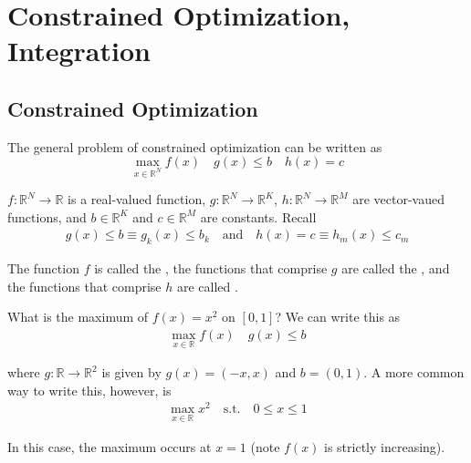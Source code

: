 \documentclass{article}
\begin{document}
\displayoptions

\section{Constrained Optimization, Integration}
\label{sec:constrained_optimization_integration}

\localtableofcontents

\subsection{Constrained Optimization}
\label{sub:constrained_optimization}

The general problem of constrained optimization can be written as
\begin{equation}\label{eq:lecture5_main_problem}
  \max_{x \in \mathbb{R}^N} f(x)
  \quad
  g(x) \le b
  \quad
  h(x) = c
\end{equation}


$f: \mathbb{R}^N \to \mathbb{R}$ is a real-valued function, $g: \mathbb{R}^N \to \mathbb{R}^K$, $h: \mathbb{R}^N \to \mathbb{R}^M$ are vector-vaued functions, and $b \in \mathbb{R}^K$ and $c \in \mathbb{R}^M$ are constants. Recall
\begin{align*}
  g(x) \le b \equiv g_k(x) \le b_k
  \quad\text{and}\quad
  h(x) = c \equiv h_m(x) \le c_m
\end{align*}

The function $f$ is called the , the functions that comprise $g$ are called the , and the functions that comprise $h$ are called .

\begin{example}
  What is the maximum of $f(x) = x^2$ on $[0, 1]$? We can write this as
  \begin{align*}
    \max_{x \in \mathbb{R}} f(x)
    \quad
    g(x) \le b
  \end{align*}

  where $g: \mathbb{R} \to \mathbb{R}^2$ is given by $g(x) = (-x, x)$ and $b = (0, 1)$. A more common way to write this, however, is
  \begin{align*}
    \max_{x \in \mathbb{R}} x^2
    \quad\text{s.t.}\quad
    0 \le x \le 1
  \end{align*}

  In this case, the maximum occurs at $x = 1$ (note $f(x)$ is strictly increasing).
\end{example}
\end{document}
